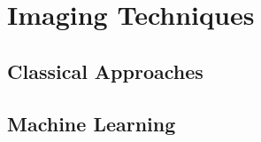 \chapter{Imaging Techniques}\label{ch:techniques}

\section{Classical Approaches}

\section{Machine Learning}
